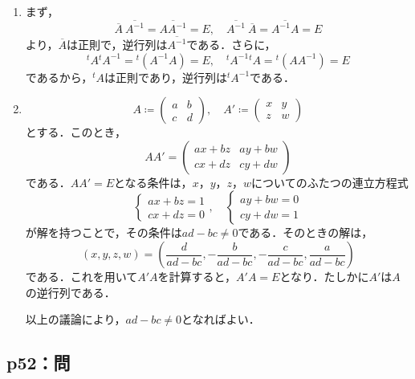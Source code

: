 \documentclass[uplatex,dvipdfmx,a4paper,10pt,fleqn]{jsarticle}
\begin{document}
    \begin{tleftbar}
        \begin{enumerate}
            \item 
        まず，
        \[
            \overline{A} \ \overline{A^{-1}} = \overline{A A^{-1}}=E,\quad \overline{A^{-1}} \ \overline{A} =\overline{A^{-1} A}=E
        \]
        より，$\overline{A}$は正則で，逆行列は$\overline{A^{-1}}$である．さらに，
        \[
            {}^t A {}^t A^{-1} ={}^t (A^{-1} A)=E,\quad {}^t A^{-1} {}^t A = {}^t (A A^{-1})=E
        \]
        であるから，${}^t A$は正則であり，逆行列は${}^t A^{-1}$である．
        \item 
        \[
            A \coloneqq \begin{pmatrix} a & b \\ c & d \end{pmatrix},\quad A' \coloneqq \begin{pmatrix} x & y \\ z & w \end{pmatrix}
        \]
        とする．このとき，
        \[
            A A' = \begin{pmatrix} a x + b z & ay + bw \\ cx + dz & cy +dw \end{pmatrix}
        \]
        である．$AA'=E$となる条件は，$x$，$y$，$z$，$w$についてのふたつの連立方程式
        \[
            \begin{cases}
                ax+bz =1 \\
                cx+dz =0
            \end{cases}
            ,\quad 
            \begin{cases}
                ay+bw=0\\
                cy+dw=1
            \end{cases}
        \]
        が解を持つことで，その条件は$ad-bc \ne 0$である．そのときの解は，
        \[
            (x,y,z,w)=  (\frac{d}{ad-bc},-\frac{b}{ad-bc},-\frac{c}{ad-bc},\frac{a}{ad-bc})
        \]
        である．これを用いて$A'A$を計算すると，$A' A =E$となり．たしかに$A'$は$A$の逆行列である．
    
        以上の議論により，$ad - bc \ne 0$となればよい．
        \end{enumerate}
    \end{tleftbar}


    \subsection*{p52：問}
\end{document}
